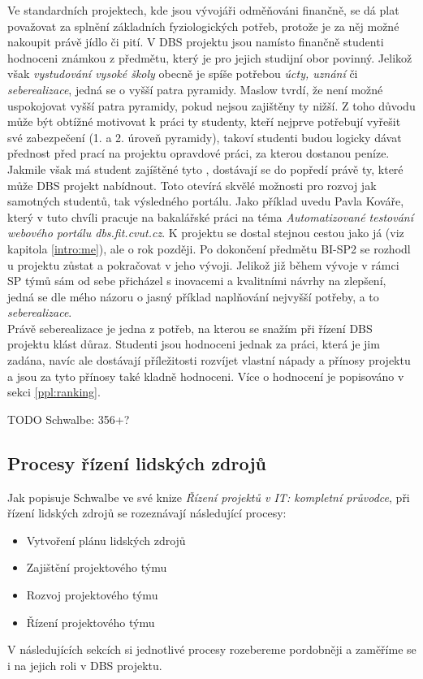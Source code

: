 Ve standardních projektech, kde jsou vývojáři odměňováni finančně, se dá plat považovat za splnění základních fyziologických potřeb, protože je za něj možné nakoupit právě jídlo či pití. V DBS projektu jsou namísto finančně studenti hodnoceni známkou z předmětu, který je pro jejich studijní obor povinný. Jelikož však \emph{vystudování vysoké školy} obecně je spíše potřebou \emph{úcty, uznání} či \emph{seberealizace}, jedná se o vyšší patra pyramidy. Maslow tvrdí, že není možné uspokojovat vyšší patra pyramidy, pokud nejsou zajištěny ty nižší. Z toho důvodu může být obtížné motivovat k práci ty studenty, kteří nejprve potřebují vyřešit své zabezpečení (1. a 2. úroveň pyramidy), takoví studenti budou logicky dávat přednost před prací na projektu opravdové práci, za kterou dostanou peníze. Jakmile však má student zajíštěné tyto , dostávají se do popředí právě ty, které může DBS projekt nabídnout. Toto otevírá skvělé možnosti pro rozvoj jak samotných studentů, tak výsledného portálu. Jako příklad uvedu Pavla Kováře, který v tuto chvíli pracuje na bakalářské práci na téma \emph{Automatizované testování webového portálu dbs.fit.cvut.cz}. K projektu se dostal stejnou cestou jako já (viz kapitola \ref{intro:me}), ale o rok později. Po dokončení předmětu BI-SP2 se rozhodl u projektu zůstat a pokračovat v jeho vývoji. Jelikož již během vývoje v rámci SP týmů sám od sebe přicházel s inovacemi a kvalitními návrhy na zlepšení, jedná se dle mého názoru o jasný příklad naplňování nejvyšší potřeby, a to \emph{seberealizace}.\\
Právě seberealizace je jedna z potřeb, na kterou se snažím při řízení DBS projektu klást důraz. Studenti jsou hodnoceni jednak za práci, která je jim zadána, navíc ale dostávají příležitosti rozvíjet vlastní nápady a přínosy projektu a jsou za tyto přínosy také kladně hodnoceni. Více o hodnocení je popisováno v sekci \ref{ppl:ranking}.

TODO Schwalbe: 356+?

\subsection{Procesy řízení lidských zdrojů}

Jak popisuje Schwalbe \cite{schwalbe} ve své knize \emph{Řízení projektů v IT: kompletní průvodce}, při řízení lidských zdrojů se rozeznávají následující procesy:
\begin{itemize}
	\item Vytvoření plánu lidských zdrojů
	\item Zajištění projektového týmu
	\item Rozvoj projektového týmu
	\item Řízení projektového týmu
\end{itemize}
V následujících sekcích si jednotlivé procesy rozebereme pordobněji a zaměříme se i na jejich roli v DBS projektu.


